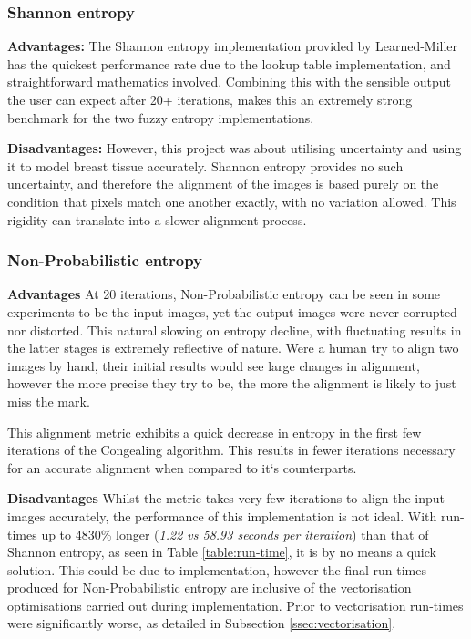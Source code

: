 \subsubsection{Shannon entropy}

\textbf{Advantages: }
The Shannon entropy implementation provided by Learned-Miller has the quickest performance rate due to the lookup table implementation, and straightforward mathematics involved. Combining this with the sensible output the user can expect after 20+ iterations, makes this an extremely strong benchmark for the two fuzzy entropy implementations.

\textbf{Disadvantages: }
However, this project was about utilising uncertainty and using it to model breast tissue accurately. Shannon entropy provides no such uncertainty, and therefore the alignment of the images is based purely on the condition that pixels match one another exactly, with no variation allowed. This rigidity can translate into a slower alignment process.

\subsubsection{Non-Probabilistic entropy}

\textbf{Advantages}
At 20 iterations, Non-Probabilistic entropy can be seen in some experiments to be  the input images, yet the output images were never corrupted nor distorted. This natural slowing on entropy decline, with fluctuating results in the latter stages is extremely reflective of nature. Were a human try to align two images by hand, their initial results would see large changes in alignment, however the more precise they try to be, the more the alignment is likely to just miss the mark.

This alignment metric exhibits a quick decrease in entropy in the first few iterations of the \Gls{Congealing} algorithm. This results in fewer iterations necessary for an accurate alignment when compared to it`s counterparts.

\noindent \textbf{Disadvantages}
Whilst the metric takes very few iterations to align the input images accurately, the performance of this implementation is not ideal. With run-times up to 4830\% longer (\textit{1.22 vs 58.93 seconds per iteration}) than that of Shannon entropy, as seen in Table \ref{table:run-time}, it is by no means a quick solution. This could be due to implementation, however the final run-times produced for Non-Probabilistic entropy are inclusive of the vectorisation optimisations carried out during implementation. Prior to vectorisation run-times were significantly worse, as detailed in Subsection \ref{ssec:vectorisation}.

